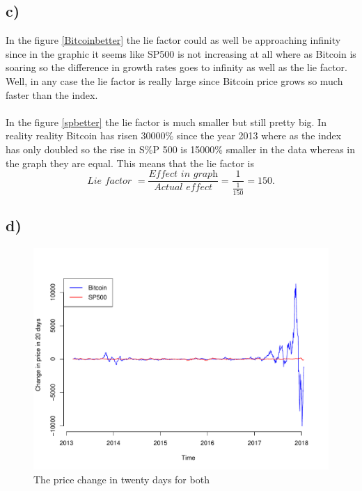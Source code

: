 \documentclass[a4paper,10pt]{article}
\begin{document}
\subsection*{c)}
In the figure \ref{Bitcoinbetter} the lie factor could as well be approaching infinity since in the graphic it seems like SP500 is not increasing at all where as Bitcoin is soaring so the difference in growth rates goes to infinity as well as the lie factor. Well, in any case the lie factor is really large since Bitcoin price grows so much faster than the index.
\\\\
In the figure \ref{spbetter} the lie factor is much smaller but still pretty big. In reality reality Bitcoin has risen 30000\% since the year 2013 where as the index has only doubled so the rise in S\%P 500 is 15000\% smaller in the data whereas in the graph they are equal. This means that the lie factor is 
\begin{equation}
\textit{Lie factor } = \frac{\textit{Effect in graph}}{\textit{Actual effect}} = \frac{1}{\frac{1}{150}} = 150.
\end{equation}

\subsection*{d)}

\begin{figure}
\centering
\includegraphics[width = \linewidth]{Honesplot}
\caption{The price change in twenty days for both}
\end{figure}
\end{document}
